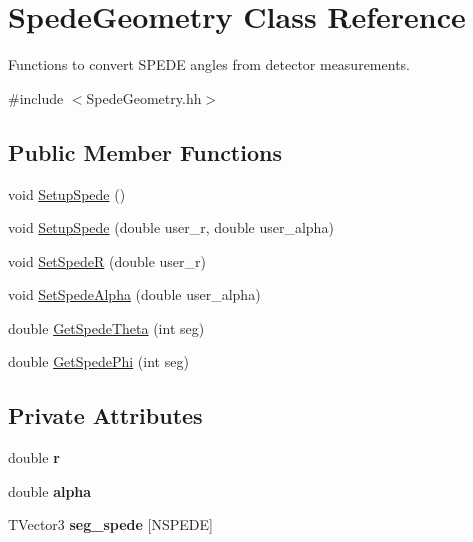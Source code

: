\hypertarget{class_spede_geometry}{}\section{Spede\+Geometry Class Reference}
\label{class_spede_geometry}


Functions to convert S\+P\+E\+DE angles from detector measurements.  




{\ttfamily \#include $<$Spede\+Geometry.\+hh$>$}

\subsection*{Public Member Functions}
\begin{DoxyCompactItemize}
\item 
void \hyperlink{class_spede_geometry_aff2cf68512c9a78eb117ff1ea44e95f0}{Setup\+Spede} ()
\item 
void \hyperlink{class_spede_geometry_ae79185d5c0e1d21a1a26ef824038ce9c}{Setup\+Spede} (double user\+\_\+r, double user\+\_\+alpha)
\item 
void \hyperlink{class_spede_geometry_ad17f4485ee83860a40082d8c8af5237c}{Set\+SpedeR} (double user\+\_\+r)
\item 
void \hyperlink{class_spede_geometry_a94c3f5b2dbf4490db7d72514c8abe340}{Set\+Spede\+Alpha} (double user\+\_\+alpha)
\item 
double \hyperlink{class_spede_geometry_a05865b0752fb518337a9a16f8fba9085}{Get\+Spede\+Theta} (int seg)
\item 
double \hyperlink{class_spede_geometry_a93bd92636bce1259b189bb17275d238d}{Get\+Spede\+Phi} (int seg)
\end{DoxyCompactItemize}
\subsection*{Private Attributes}
\begin{DoxyCompactItemize}
\item 
\mbox{\label{class_spede_geometry_a261e76a6451ed852aa0f86339bf8892d}} 
double {\bfseries r}
\item 
\mbox{\label{class_spede_geometry_a51d125e6521bb8e15a61b33fe938548f}} 
double {\bfseries alpha}
\item 
\mbox{\label{class_spede_geometry_ace763280532b3d4dd1d644e5f9380189}} 
T\+Vector3 {\bfseries seg\+\_\+spede} \mbox{[}N\+S\+P\+E\+DE\mbox{]}
\end{DoxyCompactItemize}


